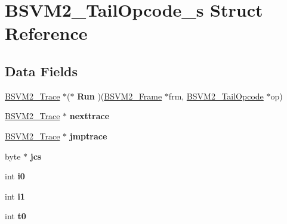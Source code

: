 \hypertarget{structBSVM2__TailOpcode__s}{\section{B\-S\-V\-M2\-\_\-\-Tail\-Opcode\-\_\-s Struct Reference}
\label{structBSVM2__TailOpcode__s}
}
\subsection*{Data Fields}
\begin{DoxyCompactItemize}
\item 
\hypertarget{structBSVM2__TailOpcode__s_ae5ff590b707cd4786256ffae73cdb234}{\hyperlink{structBSVM2__Trace__s}{B\-S\-V\-M2\-\_\-\-Trace} $\ast$($\ast$ {\bfseries Run} )(\hyperlink{structBSVM2__Frame__s}{B\-S\-V\-M2\-\_\-\-Frame} $\ast$frm, \hyperlink{structBSVM2__TailOpcode__s}{B\-S\-V\-M2\-\_\-\-Tail\-Opcode} $\ast$op)}\label{structBSVM2__TailOpcode__s_ae5ff590b707cd4786256ffae73cdb234}

\item 
\hypertarget{structBSVM2__TailOpcode__s_a5c1bc6c7272bb5479495874e91aaa86f}{\hyperlink{structBSVM2__Trace__s}{B\-S\-V\-M2\-\_\-\-Trace} $\ast$ {\bfseries nexttrace}}\label{structBSVM2__TailOpcode__s_a5c1bc6c7272bb5479495874e91aaa86f}

\item 
\hypertarget{structBSVM2__TailOpcode__s_a8cd565a77b3dc9f5162eecdd56fb8309}{\hyperlink{structBSVM2__Trace__s}{B\-S\-V\-M2\-\_\-\-Trace} $\ast$ {\bfseries jmptrace}}\label{structBSVM2__TailOpcode__s_a8cd565a77b3dc9f5162eecdd56fb8309}

\item 
\hypertarget{structBSVM2__TailOpcode__s_a98afbce76f1b7145c968ff09bd26b650}{byte $\ast$ {\bfseries jcs}}\label{structBSVM2__TailOpcode__s_a98afbce76f1b7145c968ff09bd26b650}

\item 
\hypertarget{structBSVM2__TailOpcode__s_a8a853107ea0540b7815c5d4609fc731a}{int {\bfseries i0}}\label{structBSVM2__TailOpcode__s_a8a853107ea0540b7815c5d4609fc731a}

\item 
\hypertarget{structBSVM2__TailOpcode__s_a6b3cac3c559d0b7fa4fc94b55c0dba8d}{int {\bfseries i1}}\label{structBSVM2__TailOpcode__s_a6b3cac3c559d0b7fa4fc94b55c0dba8d}

\item 
\hypertarget{structBSVM2__TailOpcode__s_af9004a416dd52538ed313ce8137c5ace}{int {\bfseries t0}}\label{structBSVM2__TailOpcode__s_af9004a416dd52538ed313ce8137c5ace}


\end{DoxyCompactItemize}

